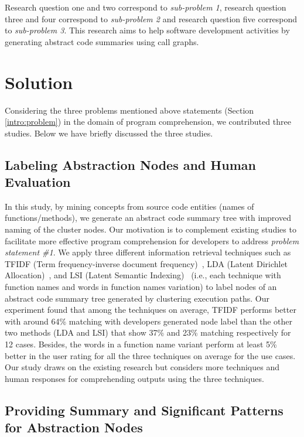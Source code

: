 Research question one and two correspond to \emph{sub-problem 1}, research question three and four correspond to \emph{sub-problem 2} and research question five correspond to \emph{sub-problem 3}. This research aims to help software development activities by generating abstract code summaries using call graphs. 



\section{Solution}
\label{intro:solution}
Considering the three problems mentioned above statements (Section \ref{intro:problem}) in the domain of program comprehension, we contributed three studies. Below we have briefly discussed the three studies.  

\subsection{Labeling Abstraction Nodes and Human Evaluation}

In this study, by mining concepts from source code entities (names of functions/methods), we generate an abstract code summary tree
with improved naming of the cluster nodes. Our motivation is to complement existing studies to facilitate more effective program comprehension for
developers to address \emph{problem statement \#1}. We apply three different information retrieval techniques such as TFIDF (Term frequency-inverse document frequency)~\cite{ramos2003usingTfidfRelevance}, LDA (Latent  Dirichlet  Allocation)~\cite{blei2003latentLDA}, and LSI (Latent Semantic Indexing)~\cite{deerwester1990indexingLSI} (i.e., each technique with function
names and words in function names variation) to label nodes of an abstract code summary tree generated by clustering execution paths. Our experiment found that among the techniques on average, TFIDF performs better with around 64\% matching with developers generated node label than the other
two methods (LDA and LSI) that show 37\% and 23\% matching respectively for 12 cases. Besides,
the words in a function name variant perform at least 5\% better in the user rating for all the three techniques on average for the use cases.
Our study draws on the existing research but considers more techniques and human responses for comprehending outputs using the three
techniques.

\subsection{Providing Summary and Significant Patterns for Abstraction Nodes}


